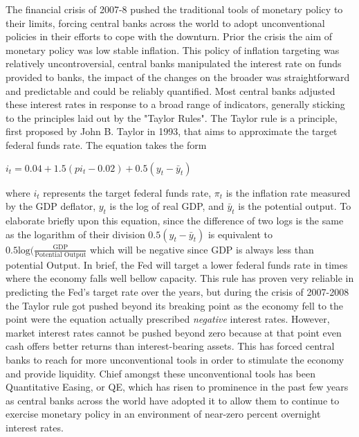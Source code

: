 \documentclass[12pt]{report}
\begin{document}
The financial crisis of 2007-8 pushed the traditional tools of monetary policy to their limits, forcing central banks across the world to adopt unconventional policies in their efforts to cope with the downturn.
Prior the crisis the aim of monetary policy was low stable inflation. This policy of inflation targeting was relatively uncontroversial, central banks manipulated the interest rate on funds provided to banks, the impact of the changes on the broader was straightforward and predictable and could be reliably quantified.\autocite[271]{joyce2012quantitative}
Most central banks adjusted these interest rates in response to a broad range of indicators, generally sticking to the principles laid out by the "Taylor Rules".\autocite[271]{joyce2012quantitative}
The Taylor rule is a principle, first proposed by John B. Taylor in 1993, that aims to approximate the target federal funds rate.\autocite[232]{woodford2001taylor}
The equation takes the form
\begin{center}
$i_t = 0.04 + 1.5(pi_t -0.02) + 0.5(y_t - \bar{y}_t)$
\end{center}
where $i_t$ represents the target federal funds rate, $\pi_t$ is the inflation rate measured by the GDP deflator, $y_t$ is the log of real GDP, and $\bar{y}_t$ is the potential output.\autocite[232]{woodford2001taylor}
To elaborate briefly upon this equation, since the difference of two logs is the same as the logarithm of their division $0.5(y_t - \bar{y}_t)$ is equivalent to $0.5\mbox{log}(\frac{\mbox{GDP}}{\mbox{Potential Output}}$ which will be negative since GDP is always less than potential Output.
In brief, the Fed will target a lower federal funds rate in times where the economy falls well bellow capacity.
This rule has proven very reliable in predicting the Fed's target rate over the years,\autocite[232]{woodford2001taylor} but during the crisis of 2007-2008 the Taylor rule got pushed beyond its breaking point as the economy fell to the point were the equation actually prescribed \emph{negative} interest rates.
However, market interest rates cannot be pushed beyond zero because at that point even cash offers better returns than interest-bearing assets.\autocite[272]{joyce2012quantitative}
This has forced central banks to reach for more unconventional tools in order to stimulate the economy and provide liquidity.
Chief amongst these unconventional tools has been Quantitative Easing, or QE, which has risen to prominence in the past few years as central banks across the world have adopted it to allow them to continue to exercise monetary policy in an environment of near-zero percent overnight interest rates.
\end{document}
